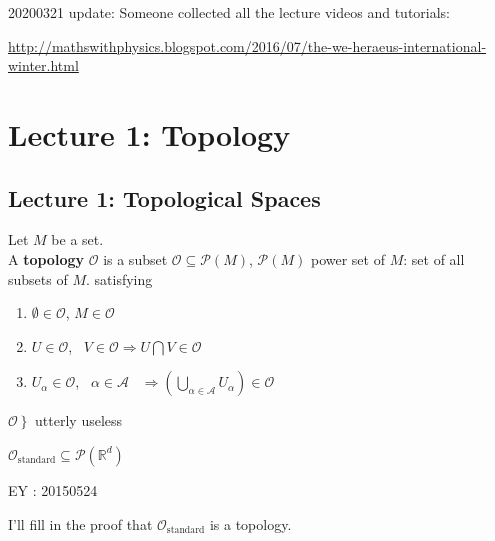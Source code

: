 20200321 update: Someone collected all the lecture videos and tutorials:

\url{http://mathswithphysics.blogspot.com/2016/07/the-we-heraeus-international-winter.html}

\section{Lecture 1: Topology}

\subsection{Lecture 1: Topological Spaces}

\begin{definition}
	Let $M$ be a set.  \\
	A \textbf{topology} $\mathcal{O}$ is a subset $\mathcal{O} \subseteq \mathcal{P}(M)$, $\mathcal{P}(M)$ power set of $M$: set of all subsets of $M$. satisfying
	\begin{enumerate}
		\item[(i)] $\emptyset \in \mathcal{O}$, $M \in \mathcal{O}$ 
		\item[(ii)] $ U \in \mathcal{O}$, \, $V \in \mathcal{O} \Longrightarrow U\bigcap V \in \mathcal{O}$ 
		\item[(iii)] $U_{\alpha} \in \mathcal{O}$, \, $\alpha \in \mathcal{A}$ \, $\Longrightarrow \left( \bigcup_{\alpha \in \mathcal{A}} U_{\alpha} \right) \in \mathcal{O}$
	\end{enumerate}
\end{definition}

$ \left. \mathcal{O} \right\} $ utterly useless

\begin{definition}
	$\mathcal{O}_{\text{standard}} \subseteq \mathcal{P}(\mathbb{R}^d)$
\end{definition}

EY : 20150524 

I'll fill in the proof that $\mathcal{O}_{\text{standard}}$ is a topology.  

